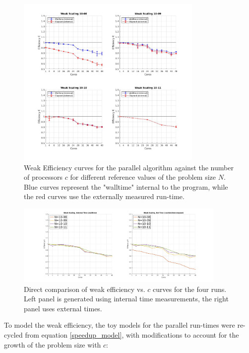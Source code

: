 \documentclass{article}
\begin{document}
\begin{figure}[H]
\centering
\includegraphics[width=0.8\textwidth]{weak_scaling1}
\caption{Weak Efficiency curves for the parallel algorithm against the number of processors $c$ for different reference values of the problem size $N$. Blue curves represent the "walltime" internal to the program, while the red curves use the externally measured run-time. }
\label{weak_scaling1}
\end{figure}

\begin{figure}[h]
\includegraphics[width=0.9\textwidth]{weak_scaling2}
\caption{Direct comparison of weak efficiency vs. $c$ curves for the four runs. Left panel is generated using internal time measurements, the right panel uses external times.}
\end{figure}
\label{weak_scaling2}


To model the weak efficiency, the toy models for the parallel run-times were re-cycled from equation \ref{speedup_model}, with modifications to account for the growth of the problem size with $c$:
\end{document}
